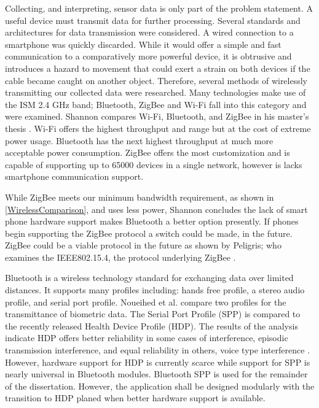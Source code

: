 Collecting, and interpreting, sensor data is only part of the problem statement. A useful device must transmit data for further processing. Several standards and architectures for data transmission were considered. A wired connection to a smartphone was quickly discarded. While it would offer a simple and fast communication to a comparatively more powerful device, it is obtrusive and introduces a hazard to movement that could exert a strain on both devices if the cable became caught on another object. Therefore, several methods of wirelessly transmitting our collected data were researched. Many technologies make use of the ISM 2.4 GHz band; Bluetooth, ZigBee and Wi-Fi fall into this category and were examined.  Shannon compares Wi-Fi, Bluetooth, and ZigBee in his master's thesis \cite{Shannon2012}. Wi-Fi offers the highest throughput and range but at the cost of extreme power usage. Bluetooth has the next highest throughput at much more acceptable power consumption. ZigBee offers the most customization and is capable of supporting up to 65000 devices in a single network, however is lacks smartphone communication support.

While ZigBee meets our minimum bandwidth requirement, as shown in \cref{WirelessComparison}, and uses less power, Shannon concludes the lack of smart phone hardware support makes Bluetooth a better option presently. If phones begin supporting the ZigBee protocol a switch could be made, in the future.  ZigBee could be a viable protocol in the future as shown by Peligris; who examines the IEEE802.15.4, the protocol underlying ZigBee \cite{Pelegris2011}.

Bluetooth is a wireless technology standard for exchanging data over limited distances. It supports many profiles including: hands free profile, a stereo audio profile, and serial port profile. Noueihed et al. compare two profiles for the transmittance of biometric data. The Serial Port Profile (SPP) is compared to the recently released Health Device Profile (HDP). The results of the analysis indicate HDP offers better reliability in some cases of interference, episodic transmission interference, and equal reliability in others, voice type interference \cite{Noueihed2010}. However, hardware support for HDP is currently scarce while support for SPP is nearly universal in Bluetooth modules. Bluetooth SPP is used for the remainder of the dissertation. However, the application shall be designed modularly with the transition to HDP planed when better hardware support is available.

